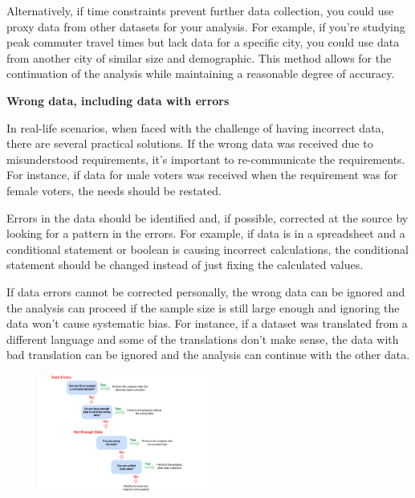 \documentclass[]{article}
\begin{document}
Alternatively, if time constraints prevent further data collection, you could use proxy data from other datasets for your analysis. For example, if you're studying peak commuter travel times but lack data for a specific city, you could use data from another city of similar size and demographic. This method allows for the continuation of the analysis while maintaining a reasonable degree of accuracy.

\textbf{Wrong data, including data with errors}

In real-life scenarios, when faced with the challenge of having incorrect data, there are several practical solutions. If the wrong data was received due to misunderstood requirements, it's important to re-communicate the requirements. For instance, if data for male voters was received when the requirement was for female voters, the needs should be restated.

Errors in the data should be identified and, if possible, corrected at the source by looking for a pattern in the errors. For example, if data is in a spreadsheet and a conditional statement or boolean is causing incorrect calculations, the conditional statement should be changed instead of just fixing the calculated values.

If data errors cannot be corrected personally, the wrong data can be ignored and the analysis can proceed if the sample size is still large enough and ignoring the data won't cause systematic bias. For instance, if a dataset was translated from a different language and some of the translations don't make sense, the data with bad translation can be ignored and the analysis can continue with the other data.

\begin{figure}[!ht]
  \centering
  \includegraphics[width=0.5\textwidth]{image/issue_data.png}
\end{figure}
\end{document}
